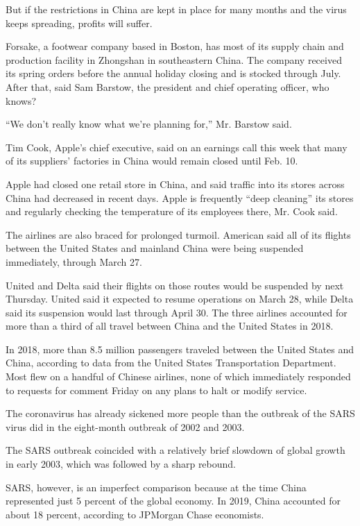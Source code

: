But if the restrictions in China are kept in place for many months and
the virus keeps spreading, profits will suffer.

Forsake, a footwear company based in Boston, has most of its supply
chain and production facility in Zhongshan in southeastern China. The
company received its spring orders before the annual holiday closing and
is stocked through July. After that, said Sam Barstow, the president and
chief operating officer, who knows?

``We don't really know what we're planning for,'' Mr. Barstow said.

Tim Cook, Apple's chief executive, said on an earnings call this week
that many of its suppliers' factories in China would remain closed until
Feb. 10.

Apple had closed one retail store in China, and said traffic into its
stores across China had decreased in recent days. Apple is frequently
``deep cleaning'' its stores and regularly checking the temperature of
its employees there, Mr. Cook said.

The airlines are also braced for prolonged turmoil. American said all of
its flights between the United States and mainland China were being
suspended immediately, through March 27.

United and Delta said their flights on those routes would be suspended
by next Thursday. United said it expected to resume operations on March
28, while Delta said its suspension would last through April 30. The
three airlines accounted for more than a third of all travel between
China and the United States in 2018.

In 2018, more than 8.5 million passengers traveled between the United
States and China, according to data from the United States
Transportation Department. Most flew on a handful of Chinese airlines,
none of which immediately responded to requests for comment Friday on
any plans to halt or modify service.

The coronavirus has already sickened more people than the outbreak of
the SARS virus did in the eight-month outbreak of 2002 and 2003.

The SARS outbreak coincided with a relatively brief slowdown of global
growth in early 2003, which was followed by a sharp rebound.

SARS, however, is an imperfect comparison because at the time China
represented just 5 percent of the global economy. In 2019, China
accounted for about 18 percent, according to JPMorgan Chase economists.

